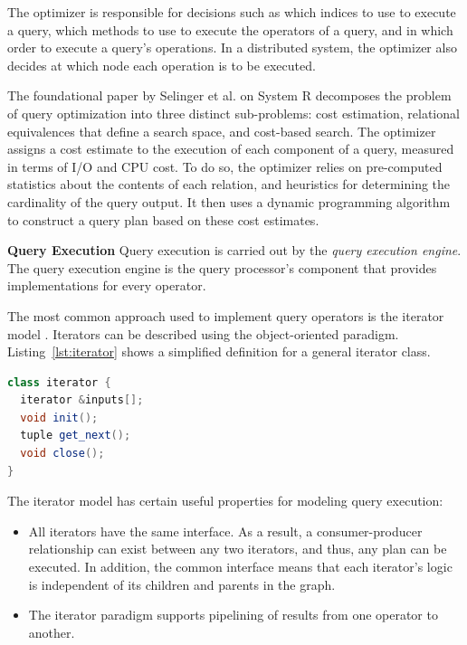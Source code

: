The optimizer is responsible for decisions such as which indices to use to execute a query,
which methods to use to execute the operators of a query,
and in which order to execute a query's operations.
In a distributed system, the optimizer also decides at which node each operation is to be executed.

The foundational paper by Selinger et al. on System R \cite{selinger:systemr} decomposes the problem of query optimization
into three distinct sub-problems: cost estimation, relational equivalences that define a search space, and cost-based
search.
The optimizer assigns a cost estimate to the execution of each component of a query, measured in terms of I/O and CPU
cost.
To do so, the optimizer relies on pre-computed statistics about the contents of each relation, and heuristics for
determining the cardinality of the query output.
It then uses a dynamic programming algorithm to construct a query plan based on these cost estimates.

\bigskip
\noindent
\textbf{Query Execution}
Query execution is carried out by the \textit{query execution engine}.
The query execution engine is the query processor's component that provides implementations for every operator.

The most common approach used to implement query operators is the iterator model \cite{graefe:queryevaluation}.
Iterators can be described using the object-oriented paradigm.
Listing~\ref{lst:iterator} shows a simplified definition for a general iterator class.

\begin{lstlisting}[caption={Iterator class pseudocode \cite{hellerstein:databasearchitecture}},label={lst:iterator},captionpos=b,language=Java]
class iterator {
  iterator &inputs[];
  void init();
  tuple get_next();
  void close();
}
\end{lstlisting}

The iterator model has certain useful properties for modeling query execution:
\begin{itemize}

  \item All iterators have the same interface.
  As a result, a consumer-producer relationship can exist between any two iterators, and thus, any plan can be executed.
  In addition, the common interface means that each iterator's logic is independent of its children and parents in the
  graph.

  \item The iterator paradigm supports pipelining of results from one operator to another.

\end{itemize}

